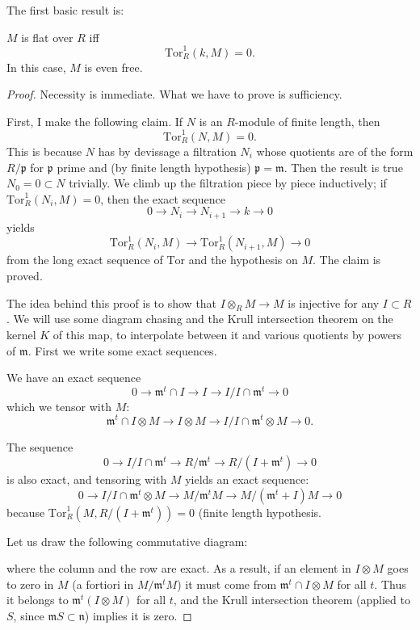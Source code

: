 The first basic result is:
\begin{theorem} $M$ is flat over $R$ iff
\[ \mathrm{Tor} ^1_R( k, M) = 0.\]
In this case, $M$ is even free.
\end{theorem}

\begin{proof} 
Necessity is immediate.  What we have to prove is sufficiency.

First, I make the following claim. If $N$ is an $R$-module of finite length, then
\[ \mathrm{Tor} ^1_R( N, M)=0.\]
This is because $N$ has by devissage a filtration $N_i$ whose quotients are of the form $R/\mathfrak{p}$ for $\mathfrak{p}$ prime and (by finite length hypothesis) $\mathfrak{p}= \mathfrak{m}$.  
Then the result is true $N_0=0 \subset N$ trivially.  We climb up the filtration piece by piece inductively; if $\mathrm{Tor} ^1_R(N_i, M)=0$, then the exact sequence
\[ 0 \to N_i \to N_{i+1} \to k \to 0 \]
yields
\[ \mathrm{Tor} ^1_R(N_i, M) \to \mathrm{Tor} ^1_R(N_{i+1}, M) \to 0 \]
from the long exact sequence of $\mathrm{Tor} $ and the hypothesis on $M$.
The claim is proved.


The idea behind this proof is to show that $I \otimes_RM \to M$ is injective for any $I \subset R$.  We will use some diagram chasing and the Krull intersection theorem on the kernel $K$ of this map, to interpolate between it and various quotients by powers of $\mathfrak{m}$.
First we write some exact sequences.

We have an exact sequence
\[ 0 \to \mathfrak{m}^t \cap I \to I \to I/I \cap \mathfrak{m}^t \to 0\]
which we tensor with $M$:
\[   \mathfrak{m}^t \cap I \otimes M \to I \otimes M \to I/I \cap \mathfrak{m}^t \otimes M \to 0.\]

The sequence
\[ 0 \to  I/I  \cap \mathfrak{m}^t \to R/\mathfrak{m}^t \to R/(I+\mathfrak{m}^t) \to 0\]
is also exact, and tensoring with $M$ yields an exact sequence:
\[ 0 \to  I/I  \cap \mathfrak{m}^t \otimes M  \to M/\mathfrak{m}^tM  \to M/(\mathfrak{m}^t  + I) M \to 0\]
because $\mathrm{Tor} ^1_R(M,   R/(I+\mathfrak{m}^t))=0$ (finite length hypothesis.


Let us draw the following commutative diagram:\\

where the column and the row are exact.
As a result, if an element in $I \otimes M$ goes to zero in $M$ (a fortiori in  $M/\mathfrak{m}^tM$) it must come from $\mathfrak{m}^t \cap I \otimes M$ for all $t$.  Thus it belongs to $\mathfrak{m}^t(I \otimes M)$ for all $t$, and the Krull intersection theorem (applied to $S$, since $\mathfrak{m}S \subset \mathfrak{n}$) implies it is zero.

\end{proof} 

